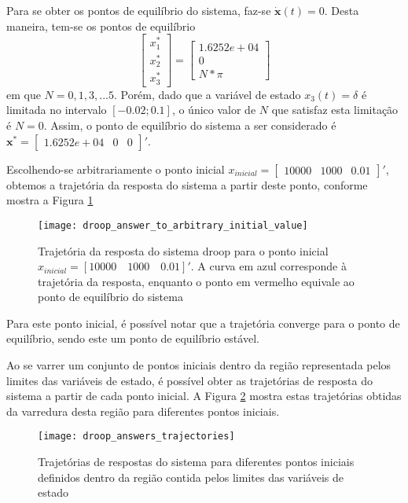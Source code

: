 Para se obter os pontos de equilíbrio do sistema, faz-se $\dot{\textbf{x}}(t) = 0$. Desta maneira, tem-se os pontos de equilíbrio
\begin{equation*}
\begin{bmatrix}x^*_1\\x^*_2\\x^*_3\end{bmatrix} = \begin{bmatrix}1.6252e+04\\0\\N*\pi\end{bmatrix}
\end{equation*}
em que $N = 0, 1, 3, ... 5$. Porém, dado que a variável de estado $x_3(t) = \delta$ é limitada no intervalo $[-0.02; 0.1]$, o único valor de $N$ que satisfaz esta limitação é $N = 0$. Assim, o ponto de equilíbrio do sistema a ser considerado é $\textbf{x}^* = \begin{bmatrix}1.6252e+04&0&0\end{bmatrix}'$.

Escolhendo-se arbitrariamente o ponto inicial $x_{inicial} = \begin{bmatrix}10000&1000&0.01\end{bmatrix}'$, obtemos a trajetória da resposta do sistema a partir deste ponto, conforme mostra a Figura \ref{fig:resp_droop}

\begin{figure}[htbp]
	\centering
	\texttt{[image: droop\_answer\_to\_arbitrary\_initial\_value]}
	\caption{Trajetória da resposta do sistema droop para o ponto inicial $x_{inicial} = [10000\quad1000\quad0.01]'$. A curva em azul corresponde à trajetória da resposta, enquanto o ponto em vermelho equivale ao ponto de equilíbrio do sistema}
	 \label{fig:resp_droop}
\end{figure}

Para este ponto inicial, é possível notar que a trajetória converge para o ponto de equilíbrio, sendo este um ponto de equilíbrio estável.

Ao se varrer um conjunto de pontos iniciais dentro da região representada pelos limites das variáveis de estado, é possível obter as  trajetórias de resposta do sistema a partir de cada ponto inicial. A Figura \ref{fig:droop_trajetorias} mostra estas trajetórias obtidas da varredura desta região para diferentes pontos iniciais.

\begin{figure}[htbp]
	\centering
	\texttt{[image: droop\_answers\_trajectories]}
	\caption{Trajetórias de respostas do sistema para diferentes pontos iniciais definidos dentro da região contida pelos limites das variáveis de estado}
	 \label{fig:droop_trajetorias}
\end{figure}

